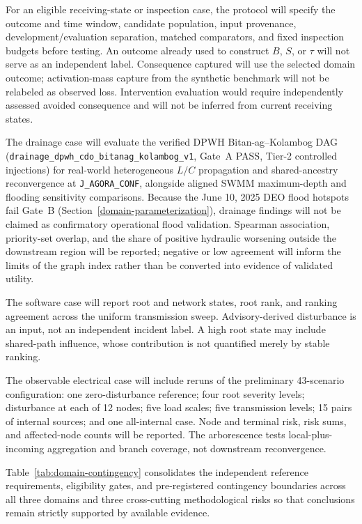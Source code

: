 For an eligible receiving-state or inspection case, the protocol will specify
the outcome and time window, candidate population, input provenance,
development/evaluation separation, matched comparators, and fixed inspection
budgets before testing. An outcome already used to construct $B$, $S$, or
$\tau$ will not serve as an independent label. Consequence captured will use
the selected domain outcome; activation-mass capture from the synthetic
benchmark will not be relabeled as observed loss. Intervention evaluation
would require independently assessed avoided consequence and will not be
inferred from current receiving states.

The drainage case will evaluate the verified DPWH Bitan-ag--Kolambog DAG
(\texttt{drainage\_\allowbreak dpwh\_\allowbreak cdo\_\allowbreak bitanag\_\allowbreak kolambog\_v1},
Gate~A PASS, Tier-2 controlled injections) for real-world heterogeneous $L/C$
propagation and shared-ancestry reconvergence at
\texttt{J\_\allowbreak AGORA\_\allowbreak CONF}, alongside aligned SWMM
maximum-depth and flooding sensitivity comparisons. Because the June 10, 2025
DEO flood hotspots fail Gate~B (Section~\ref{domain-parameterization}),
drainage findings will not be claimed as confirmatory operational flood
validation. Spearman association, priority-set overlap, and the share of
positive hydraulic worsening outside the downstream region will be reported;
negative or low agreement will inform the limits of the graph index rather
than be converted into evidence of validated utility.

The software case will report root and network states, root rank, and
ranking agreement across the uniform transmission sweep. Advisory-derived
disturbance is an input, not an independent incident label. A high root
state may include shared-path influence, whose contribution is not
quantified merely by stable ranking.

The observable electrical case will include reruns of the preliminary
43-scenario configuration: one zero-disturbance reference; four root
severity levels; disturbance at each of 12 nodes; five load scales; five
transmission levels; 15 pairs of internal sources; and one all-internal
case. Node and terminal risk, risk sums, and affected-node counts will
be reported. The arborescence tests local-plus-incoming aggregation and
branch coverage, not downstream reconvergence.

Table~\ref{tab:domain-contingency} consolidates the independent reference
requirements, eligibility gates, and pre-registered contingency boundaries
across all three domains and three cross-cutting methodological risks so that
conclusions remain strictly supported by available evidence.

